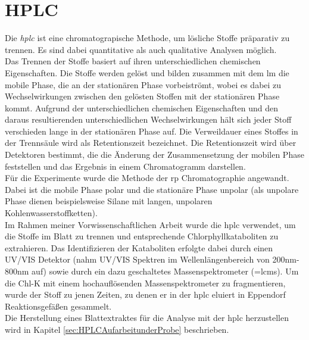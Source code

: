 \section{HPLC}

Die \textit{\gls{hplc}} ist eine chromatograpische Methode, um lösliche Stoffe präparativ zu trennen. Es sind dabei quantitative als auch qualitative Analysen möglich. \cite[S. 165]{Chromatographie} \\

Das Trennen der Stoffe basiert auf ihren unterschiedlichen chemischen Eigenschaften. Die Stoffe werden gelöst und bilden zusammen mit dem  \gls{lm} die mobile Phase, die an der stationären Phase vorbeiströmt, wobei es dabei zu Wechselwirkungen zwischen den gelösten Stoffen mit der stationären Phase kommt. Aufgrund der unterschiedlichen chemischen Eigenschaften und den daraus resultierenden unterschiedlichen Wechselwirkungen hält sich jeder Stoff verschieden lange in der stationären Phase auf. Die Verweildauer eines Stoffes in der Trennsäule wird als Retentionszeit bezeichnet. \cite[S. 31-32]{Chromatographie} Die Retentionszeit wird über Detektoren bestimmt, die die Änderung der Zusammensetzung der mobilen Phase feststellen und das Ergebnis in einem Chromatogramm darstellen.  \cite[S. 46]{Chromatographie} \\

Für die Experimente wurde die Methode der \gls{rp} Chromatographie angewandt. Dabei ist die mobile Phase polar und die stationäre Phase unpolar (als unpolare Phase dienen beispielsweise Silane mit langen, unpolaren Kohlenwasserstoffketten). \cite[S. 189]{Chromatographie}\\

Im Rahmen meiner Vorwissenschaftlichen Arbeit wurde die \gls{hplc} verwendet, um die Stoffe im Blatt zu trennen und entsprechende Chlorphyllkataboliten zu extrahieren. Das Identifizieren der Kataboliten erfolgte dabei durch einen UV/VIS Detektor (nahm UV/VIS Spektren im Wellenlängenbereich von 200nm-800nm auf) sowie durch ein dazu geschaltetes Massenspektrometer (=\gls{lcms}). Um die \gls{Chl-K} mit einem hochauflösenden Massenspektrometer zu fragmentieren, wurde der Stoff zu jenen Zeiten, zu denen er in der \gls{hplc} eluiert in Eppendorf Reaktionsgefäßen gesammelt.\\

Die Herstellung eines Blattextraktes für die Analyse mit der \gls{hplc} herzustellen wird in Kapitel \ref{sec:HPLCAufarbeitunderProbe} beschrieben. 

